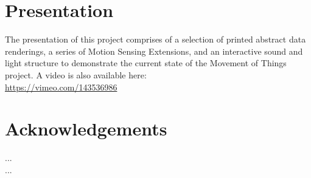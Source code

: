 \documentclass{sigchi}
\begin{document}
\section{Presentation}

The presentation of this project comprises of a selection
of printed abstract data renderings, a series of Motion
Sensing Extensions, and an interactive sound and light
structure to demonstrate the current state of the
Movement of Things project. A video is also available here:\\
{\url{https://vimeo.com/143536986}}

\section{Acknowledgements}

...\\
...

\balance



\end{document}
